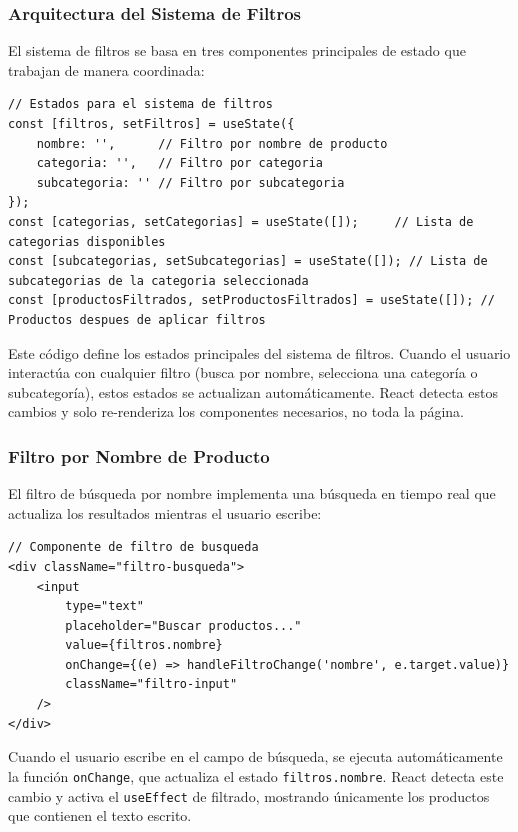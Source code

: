 \documentclass[a4paper,12pt]{article}
\begin{document}
\subsubsection{Arquitectura del Sistema de Filtros}

El sistema de filtros se basa en tres componentes principales de estado que trabajan de manera coordinada:

\begin{lstlisting}[language=JSX, caption={Estados del sistema de filtros}]
// Estados para el sistema de filtros
const [filtros, setFiltros] = useState({
    nombre: '',      // Filtro por nombre de producto
    categoria: '',   // Filtro por categoria
    subcategoria: '' // Filtro por subcategoria
});
const [categorias, setCategorias] = useState([]);     // Lista de categorias disponibles
const [subcategorias, setSubcategorias] = useState([]); // Lista de subcategorias de la categoria seleccionada
const [productosFiltrados, setProductosFiltrados] = useState([]); // Productos despues de aplicar filtros
\end{lstlisting}

Este código define los estados principales del sistema de filtros. Cuando el usuario interactúa con cualquier filtro (busca por nombre, selecciona una categoría o subcategoría), estos estados se actualizan automáticamente. React detecta estos cambios y solo re-renderiza los componentes necesarios, no toda la página.
\newpage
\subsubsection{Filtro por Nombre de Producto}

El filtro de búsqueda por nombre implementa una búsqueda en tiempo real que actualiza los resultados mientras el usuario escribe:

\begin{lstlisting}[language=JSX, caption={Componente de busqueda por nombre}]
// Componente de filtro de busqueda
<div className="filtro-busqueda">
    <input
        type="text"
        placeholder="Buscar productos..."
        value={filtros.nombre}
        onChange={(e) => handleFiltroChange('nombre', e.target.value)}
        className="filtro-input"
    />
</div>
\end{lstlisting}

Cuando el usuario escribe en el campo de búsqueda, se ejecuta automáticamente la función \texttt{onChange}, que actualiza el estado \texttt{filtros.nombre}. React detecta este cambio y activa el \texttt{useEffect} de filtrado, mostrando únicamente los productos que contienen el texto escrito.
\end{document}
